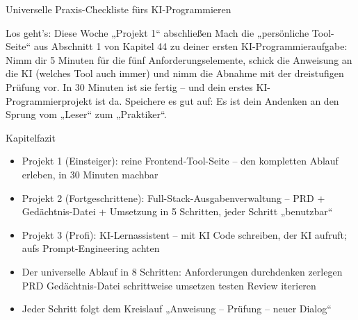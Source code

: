 \begin{center}\small\color{gray}Universelle Praxis-Checkliste fürs KI-Programmieren\end{center}

\begin{tcbpractice}{Los geht's: Diese Woche „Projekt 1“ abschließen}
Mach die „persönliche Tool-Seite“ aus Abschnitt 1 von Kapitel 44 zu deiner ersten KI-Programmieraufgabe: Nimm dir 5 Minuten für die fünf Anforderungselemente, schick die Anweisung an die KI (welches Tool auch immer) und nimm die Abnahme mit der dreistufigen Prüfung vor. In 30 Minuten ist sie fertig – und dein erstes KI-Programmierprojekt ist da. Speichere es gut auf: Es ist dein Andenken an den Sprung vom „Leser“ zum „Praktiker“.

\end{tcbpractice}

\begin{tcbsummary}{Kapitelfazit}
\begin{itemize}
  \item Projekt 1 (Einsteiger): reine Frontend-Tool-Seite – den kompletten Ablauf erleben, in 30 Minuten machbar
  \item Projekt 2 (Fortgeschrittene): Full-Stack-Ausgabenverwaltung – PRD + Gedächtnis-Datei + Umsetzung in 5 Schritten, jeder Schritt „benutzbar“
  \item Projekt 3 (Profi): KI-Lernassistent – mit KI Code schreiben, der KI aufruft; aufs Prompt-Engineering achten
  \item Der universelle Ablauf in 8 Schritten: Anforderungen durchdenken zerlegen PRD Gedächtnis-Datei schrittweise umsetzen testen Review iterieren
  \item Jeder Schritt folgt dem Kreislauf „Anweisung – Prüfung – neuer Dialog“
\end{itemize}

\end{tcbsummary}
